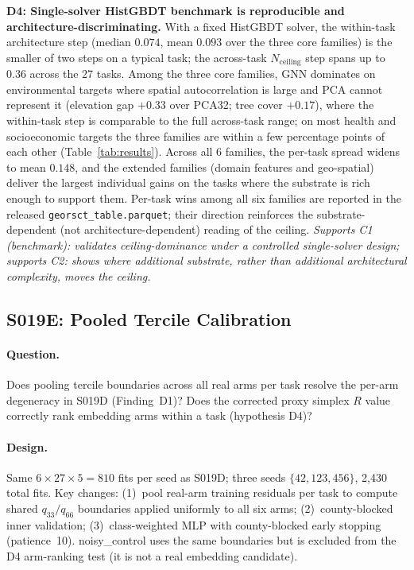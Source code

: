\documentclass{article}
\begin{document}
\textbf{D4: Single-solver HistGBDT benchmark is reproducible and architecture-discriminating.}
With a fixed HistGBDT solver, the within-task architecture step (median $0.074$, mean $0.093$ over the three core families) is the smaller of two steps on a typical task; the across-task $N_{\text{ceiling}}$ step spans up to $0.36$ across the 27 tasks. Among the three core families, GNN dominates on environmental targets where spatial autocorrelation is large and PCA cannot represent it (elevation gap $+0.33$ over PCA32; tree cover $+0.17$), where the within-task step is comparable to the full across-task range; on most health and socioeconomic targets the three families are within a few percentage points of each other (Table~\ref{tab:results}). Across all 6 families, the per-task spread widens to mean $0.148$, and the extended families (domain features and geo-spatial) deliver the largest individual gains on the tasks where the substrate is rich enough to support them. Per-task wins among all six families are reported in the released \texttt{georsct\_table.parquet}; their direction reinforces the substrate-dependent (not architecture-dependent) reading of the ceiling. \emph{Supports C1 (benchmark): validates ceiling-dominance under a controlled single-solver design; supports C2: shows where additional substrate, rather than additional architectural complexity, moves the ceiling.}

\subsection{S019E: Pooled Tercile Calibration}
\label{app:s019e}

\paragraph{Question.} Does pooling tercile boundaries across all real arms per task resolve the per-arm degeneracy in S019D (Finding~D1)? Does the corrected proxy simplex $R$ value correctly rank embedding arms within a task (hypothesis D4)?

\paragraph{Design.} Same $6 \times 27 \times 5 = 810$ fits per seed as S019D; three seeds $\{42, 123, 456\}$, 2{,}430 total fits. Key changes: (1)~pool real-arm training residuals per task to compute shared $q_{33}/q_{66}$ boundaries applied uniformly to all six arms; (2)~county-blocked inner validation; (3)~class-weighted MLP with county-blocked early stopping (patience~10). noisy\_control uses the same boundaries but is excluded from the D4 arm-ranking test (it is not a real embedding candidate).
\end{document}
